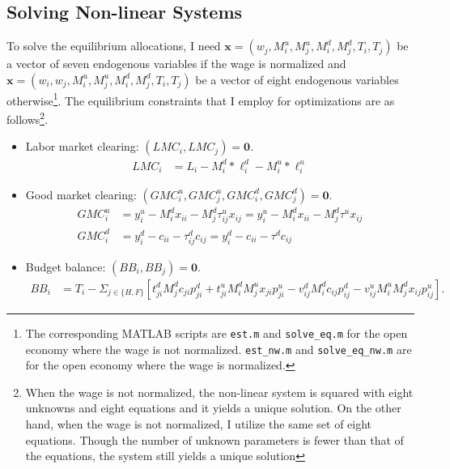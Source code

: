 \documentclass{homeworg}
\begin{document}
\subsection{Solving Non-linear Systems}

To solve the equilibrium allocations, I need $\boldsymbol{x}=(w_{j}, M^{u}_{i}, M^{u}_{j}, M^{d}_{i}, M^{d}_{j}, T_{i}, T_{j})$ be a vector of seven endogenous variables if the wage is normalized and $\boldsymbol{x}=(w_{i}, w_{j}, M^{u}_{i}, M^{u}_{j}, M^{d}_{i}, M^{d}_{j}, T_{i}, T_{j})$ be a vector of eight endogenous variables otherwise\footnote{The corresponding MATLAB scripts are \lstinline{est.m} and \lstinline{solve_eq.m} for the open economy where the wage is not normalized. \lstinline{est_nw.m} and \lstinline{solve_eq_nw.m} are for the open economy where the wage is normalized.}. The equilibrium constraints that I employ for optimizations are as follows\footnote{When the wage is not normalized, the non-linear system is squared with eight unknowns and eight equations and it yields a unique solution. On the other hand, when the wage is not normalized, I utilize the same set of eight equations. Though the number of unknown parameters is fewer than that of the equations, the system still yields a unique solution}.
\begin{itemize}[ref=Step , wide=0pt]
\item Labor market clearing: $(LMC_{i}, LMC_{j})=\boldsymbol{0}$.
\begin{equation}
\begin{aligned}
\label{eq:lmc}
LMC_{i} &= L_{i}-M^{d}_{i}*\ell^{d}_{i}-M^{u}_{i}*\ell^{u}_{i}
\end{aligned}
\end{equation}
\label{eq:gmc}
\item Good market clearing: $(GMC^{u}_{i}, GMC^{u}_{j}, GMC^{d}_{i}, GMC^{d}_{j})=\boldsymbol{0}$.
\begin{equation}
\begin{aligned}
\label{eq:gmc}
GMC^{u}_{i} &= y^{u}_{i}-M^{d}_{i}x_{ii}-M^{d}_{j}\tau^{u}_{ij}x_{ij} = y^{u}_{i}-M^{d}_{i}x_{ii}-M^{d}_{j}\tau^{u}x_{ij}\\
GMC^{d}_{i} &= y^{d}_{i}-c_{ii}-\tau^{d}_{ij}c_{ij} = y^{d}_{i}-c_{ii}-\tau^{d}c_{ij}
\end{aligned}
\end{equation}
\item Budget balance: $(BB_{i}, BB_{j})=\boldsymbol{0}$.
\begin{equation}
\begin{aligned}
\label{eq:bb}
BB_{i} &= T_{i} - \Sigma_{j\in\{H,F\}}[t^d_{ji}M^{d}_{j}c_{ji}p^{d}_{ji}+t^{u}_{ji}M^{d}_{i}M^{u}_{j}x_{ji}p^{u}_{ji}-v^{d}_{ij}M^{d}_{i}c_{ij}p^{d}_{ij}-v^{u}_{ij}M^{u}_{i}M^{d}_{j}x_{ij}p^{u}_{ij}].
\end{aligned}
\end{equation}
\end{itemize}
\end{document}

